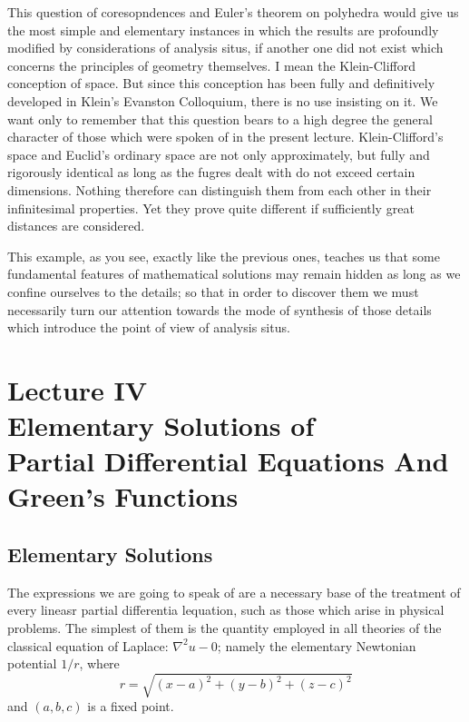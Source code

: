\documentclass[12pt,oneside]{book}
\begin{document}
This question of coresopndences and Euler's theorem on polyhedra would give us the most simple and elementary instances in which the results are profoundly modified by considerations of analysis situs, if another one did not exist which concerns the principles of geometry themselves. I mean the Klein-Clifford conception of space. But since this conception has been fully and definitively developed in Klein's Evanston Colloquium, there is no use insisting on it. We want only to remember that this question bears to a high degree the general character of those which were spoken of in the present lecture. Klein-Clifford's space and Euclid's ordinary space are not only approximately, but fully and rigorously identical as long as the fugres dealt with do not exceed certain dimensions. Nothing therefore can distinguish them from each other in their infinitesimal properties. Yet they prove quite different if sufficiently great distances are considered. \par

This example, as you see, exactly like the previous ones, teaches us that some fundamental features of mathematical solutions may remain hidden as long as we confine ourselves to the details; so that in order to discover them we must necessarily turn our attention towards the mode of synthesis of those details which introduce the point of view of analysis situs. \par

\chapter[Lecture IV]{Lecture IV\\Elementary Solutions of\\Partial Differential Equations And\\Green's Functions}
\section{Elementary Solutions}

The expressions we are going to speak of are a necessary base of the treatment of every lineasr partial differentia lequation, such as those which arise in physical problems. The simplest of them is the quantity employed in all theories of the classical equation of Laplace: $\nabla^2u-0$; namely the elementary Newtonian potential $1/r$, where
$$r=\sqrt{(x-a)^2+(y-b)^2+(z-c)^2}$$
and $(a,b,c)$ is a fixed point. \par
\end{document}
